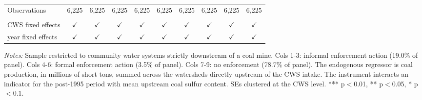 \begin{table}[htbp]
\begin{adjustbox}{width = \textwidth, center}
\begin{tabular}{lccccccccc}
          \\
         
         Observations                                                              & 6,225         & 6,225         & 6,225         & 6,225         & 6,225          & 6,225          & 6,225         & 6,225         & 6,225\\  
         
          \\
         
         CWS fixed effects                                                         & $\checkmark$  & $\checkmark$  & $\checkmark$  & $\checkmark$  & $\checkmark$   & $\checkmark$   & $\checkmark$  & $\checkmark$  & $\checkmark$\\   
         year fixed effects                                                        & $\checkmark$  & $\checkmark$  & $\checkmark$  & $\checkmark$  & $\checkmark$   & $\checkmark$   & $\checkmark$  & $\checkmark$  & $\checkmark$\\   
         
         \bottomrule
         
      \end{tabular}
      
      
      
   \end{adjustbox}
      {\tiny\linespread{1}\selectfont \par \raggedright 
   \textit{Notes:} Sample restricted to community water systems strictly downstream of a coal mine. Cols 1-3: informal enforcement action (19.0\% of panel). Cols 4-6: formal enforcement action (3.5\% of panel). Cols 7-9: no enforcement (78.7\% of panel). The endogenous regressor is coal production, in millions of short tons, summed across the watersheds directly upstream of the CWS intake. The instrument interacts an indicator for the post-1995 period with mean upstream coal sulfur content. SEs clustered at the CWS level. *** p$<$0.01, ** p$<$0.05, * p$<$0.1.}
   
\end{table}


